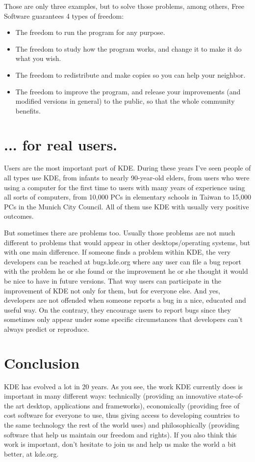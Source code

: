 Those are only three examples, but to solve those problems, among others, Free Software guarantees 4 types of freedom:

\begin{itemize}
\item The freedom to run the program for any purpose.
\item The freedom to study how the program works, and change it to make it do what you wish.
\item The freedom to redistribute and make copies so you can help your neighbor.
\item The freedom to improve the program, and release your improvements (and modified versions in general) to the public, so that the whole community benefits.
\end{itemize}

\section*{... for real users.}

Users are the most important part of KDE. During these years I've seen people of all types use KDE, from infants to nearly 90-year-old elders, from users who were using a computer for the first time to users with many years of experience using all sorts of computers, from 10,000 PCs in elementary schools in Taiwan to 15,000 PCs in the Munich City Council. All of them use KDE with usually very positive outcomes.

But sometimes there are problems too. Usually those problems are not much different to problems that would appear in other desktops/operating systems, but with one main difference. If someone finds a problem within KDE, the very developers can be reached at bugs.kde.org where any user can file a bug report with the problem he or she found or the improvement he or she thought it would be nice to have in future versions. That way users can participate in the improvement of KDE not only for them, but for everyone else. And yes, developers are not offended when someone reports a bug in a nice, educated and useful way. On the contrary, they encourage users to report bugs since they sometimes only appear under some specific circumstances that developers can't always predict or reproduce.

\section*{Conclusion}
KDE has evolved a lot in 20 years. As you see, the work KDE currently does is important in many different ways: technically (providing an innovative state-of-the art desktop, applications and frameworks), economically (providing free of cost software for everyone to use, thus giving access to developing countries to the same technology the rest of the world uses) and philosophically (providing software that help us maintain our freedom and rights). If you also think this work is important, don't hesitate to join us and help us make the world a bit better, at kde.org.
